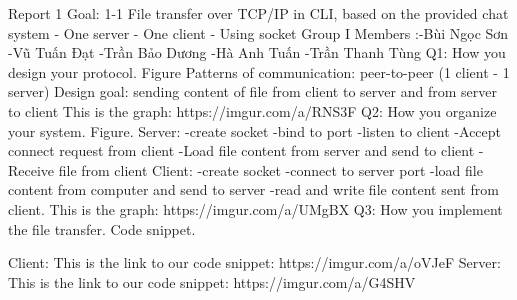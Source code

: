 Report 1
Goal: 1-1 File transfer over TCP/IP in CLI, based on the provided chat system
- One server
- One client
- Using socket
Group I
Members :-Bùi Ngọc Sơn
      	 -Vũ Tuấn Đạt
  	     -Trần Bảo Dương
  	     -Hà Anh Tuấn 
  	     -Trần Thanh Tùng
Q1: How you design your protocol. Figure
	Patterns of communication: peer-to-peer (1 client - 1 server)
	Design goal: sending content of file from client to server and from server to client
  This is the graph:
  https://imgur.com/a/RNS3F
Q2: How you organize your system. Figure.
Server:
-create socket
-bind to port
-listen to client
-Accept connect request from client
-Load file content from server and send to client
-Receive file from client
Client:
-create socket
-connect to server port
-load file content from computer and send to server
-read and write file content sent from client.
  This is the graph:
  https://imgur.com/a/UMgBX
Q3: How you implement the file transfer. Code snippet.
 
Client:
This is the link to our code snippet:
https://imgur.com/a/oVJeF
Server:
This is the link to our code snippet:
https://imgur.com/a/G4SHV
